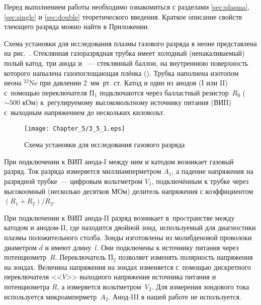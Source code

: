 



Перед выполнением работы необходимо ознакомиться с разделами
\ref{sec:plasma}, \ref{sec:single} и \ref{sec:double} теоретического введения.
Краткое описание свойств тлеющего разряда можно найти в Приложении.

Схема установки для исследования плазмы газового разряда в неоне представлена на
рис.~. Стеклянная газоразрядная
трубка имеет холодный (ненакаливаемый) полый катод, три анода и
~--- стеклянный баллон, на
внутреннюю поверхность которого напылена газопоглощающая плёнка
(). Трубка наполнена изотопом неона
$^{22}$Ne при давлении 2~мм~рт. ст. Катод и один из анодов (I или II) с~помощью
переключателя $\text{П}_1$ подключаются через
балластный резистор~$R_\text{б}$ ($\sim500$ кОм) к~регулируемому высоковольтному
источнику питания (ВИП) с~выходным
напряжением до нескольких киловольт.

\begin{figure}[h!]
    \centering
	\texttt{[image: Chapter\_5/3\_5\_1.eps]}
	\caption{Схема установки для исследования газового разряда}
\end{figure}

При подключении к ВИП анода-I между ним и катодом возникает газовый разряд. Ток
разряда измеряется миллиамперметром
$A_1$, а падение напряжения на разрядной трубке~--- цифровым вольтметром
$V_{1}$, подключённым к трубке через
высокоомный (несколько десятков МОм) делитель напряжения с коэффициентом
$(R_1+R_2)/R_2$.

При подключении к ВИП анода-II разряд возникает в~проcтранстве между катодом и
анодом-II, где находится двойной зонд,
используемый для диагностики плазмы положительного столба. Зонды изготовлены из
молибденовой проволоки диаметром
$d$ и имеют длину~$l$. Они подключены к источнику питания через
потенциометр~$R$. Переключатель
$\text{П}_2$ позволяет изменять полярность напряжения на зондах. Величина
напряжения на зондах изменяется с~помощью дискретного
переключателя <<$V$>> выходного напряжения источника питания и потенциометра
$R$, а измеряется вольтметром~$V_2$. Для
измерения зондового тока используется микроамперметр~$A_2$.
Анод-III в нашей работе не используется.


